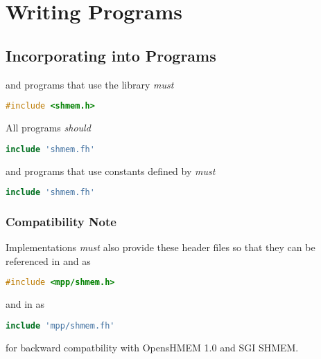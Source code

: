\section{Writing \openshmem Programs}

\subsection{Incorporating \openshmem into Programs}


\Clang{} and \Cpp{} programs that use the \openshmem library \emph{must}

\begin{lstlisting}[language=C++]
#include <shmem.h>
\end{lstlisting}

All \Fortran{} \openshmem programs \emph{should}

\begin{lstlisting}[language=Fortran]
include 'shmem.fh'
\end{lstlisting}

and \Fortran{} \openshmem programs that use constants defined by \openshmem
\emph{must}

\begin{lstlisting}[language=Fortran]
include 'shmem.fh'
\end{lstlisting}

\subsubsection{Compatibility Note}

Implementations \emph{must} also provide these header files so that
they can be referenced in \Clang{} and \Cpp{} as

\begin{lstlisting}[language=C++]
#include <mpp/shmem.h>
\end{lstlisting}

and in \Fortran{} as

\begin{lstlisting}[language=Fortran]
include 'mpp/shmem.fh'
\end{lstlisting}

for backward compatbility with OpensHMEM 1.0 and SGI SHMEM.

